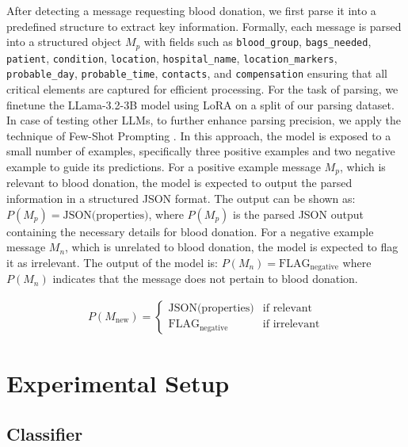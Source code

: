 \documentclass[11pt]{article}
\begin{document}
After detecting a message requesting blood donation, we first parse it into a predefined structure to extract key information. Formally, each message is parsed into a structured object \( M_p \) with fields such as \texttt{blood\_group}, \texttt{bags\_needed}, \texttt{patient}, \texttt{condition}, \texttt{location}, \texttt{hospital\_name}, \texttt{location\_markers}, \texttt{probable\_day}, \texttt{probable\_time}, \texttt{contacts}, and \texttt{compensation} ensuring that all critical elements are captured for efficient processing. For the task of parsing, we finetune the LLama-3.2-3B model using LoRA on a split of our parsing dataset. In case of testing other LLMs, to further enhance parsing precision, we apply the technique of Few-Shot Prompting \cite{27reynolds2021prompt}. In this approach, the model is exposed to a small number of examples, specifically three positive examples and two negative example to guide its predictions. For a positive example message \( M_p \), which is relevant to blood donation, the model is expected to output the parsed information in a structured JSON format. The output can be shown as: $P(M_p) = \text{JSON(properties)}$, where \( P(M_p) \) is the parsed JSON output containing the necessary details for blood donation.
For a negative example message \( M_n \), which is unrelated to blood donation, the model is expected to flag it as irrelevant. The output of the model is: \( P(M_n) = \text{FLAG}_{\text{negative}} \)
where \( P(M_n) \) indicates that the message does not pertain to blood donation.



\begin{align*}
P(M_{\text{new}}) = \begin{cases}
\text{JSON(properties)} & \text{if relevant} \\
\text{FLAG}_{\text{negative}} & \text{if irrelevant}
\end{cases}
\end{align*}





\section{Experimental Setup}

\subsection{Classifier}
\end{document}
